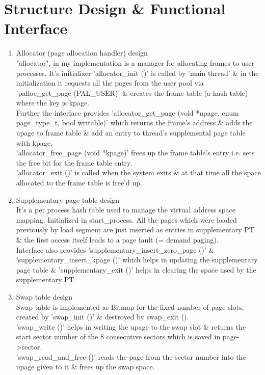 \documentclass[a4,11pt]{article}
\begin{document}
\section{Structure Design \& Functional Interface}
\begin{enumerate} 
\item \textsf{Allocator (page allocation handler) design}\\
"allocator", in my implementation is a manager for allocating frames to user processes. It's initializer 'allocator\_init ()' is called by 'main thread' \& in the initialization it requests all the pages from the user pool via 'palloc\_get\_page (PAL\_USER)' \& creates the frame table (a hash table) where the key is kpage.\\
	Further the interface provides 'allocator\_get\_page (void *upage, enum page\_type\_t, bool writable)' which returns the frame's address \& adds the upage to frame table \& add an entry to thread's supplemental page table with kpage. \\
	'allocator\_free\_page (void *kpage)' frees up the frame table's entry i.e. sets the free bit for the frame table entry.\\
	'allocator\_exit ()' is called when the system exits \& at that time all the space allocated to the frame table is free'd up.

\item \textsf{Supplementary page table design}\\
It's a per process hash table used to manage the virtual address space mapping. Initialized in start\_process. All the pages which were loaded previously by load segment are just inserted as entries in supplementary PT \& the first access itself leads to a page fault (= demand paging).\\
			Interface also provides 'supplementary\_insert\_zero\_page ()' \& 'supplementary\_insert\_kpage ()' which helps in updating the supplementary page table \& 'supplementary\_exit ()' helps in clearing the space used by the supplementary PT.

\item \textsf{Swap table design} \\
Swap table is implemented as Bitmap for the fixed number of page slots, created by 'swap\_init ()' \& destroyed by swap\_exit ().\\
'swap\_write ()' helps in writing the upage to the swap slot \& returns the start sector number of the 8 consecutive sectors which is saved in page->sector. \\
'swap\_read\_and\_free ()' reads the page from the sector number into the upage given to it \& frees up the swap space.
\end{enumerate}
\end{document}
